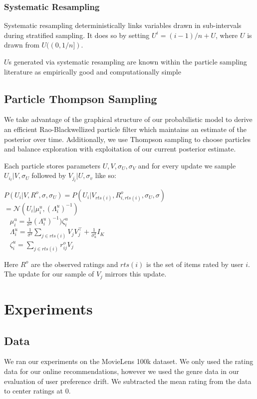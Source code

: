 \documentclass{article}
\begin{document}
\subsubsection{Systematic Resampling}
Systematic resampling deterministically links variables drawn in sub-intervals during stratified sampling. It does so by setting $U^i = (i-1)/n + U$, where $U$ is drawn from $U((0, 1/n])$.

$U$s generated via systematic resampling are known within the particle sampling literature as empirically good and computationally simple \cite{douc2005comparison}

\subsection{Particle Thompson Sampling}
We take advantage of the graphical structure of our probabilistic model to derive an efficient Rao-Blackwellized particle filter which maintains an estimate of the posterior over time. Additionally, we use Thompson sampling to choose particles and balance exploration with exploitation of our current posterior estimate.

Each particle stores parameters $U, V, \sigma_U, \sigma_V$ and for every update we sample $U_{i_t}|V, \sigma_U$
followed by $V_{j_t}|U, \sigma_v$ like so:
\begin{center}
$P(U_i | V, R^o, \sigma, \sigma_U) = P(U_i | V_{rts(i)}, R^o_{i, rts(i)}, \sigma_U, \sigma)$ \\
$= \mathcal{N}(U_i | \mu^u_i, (\Lambda_i^u)^{-1})$ \\
\ \newline
{} $\mu_i^u = \frac{1}{\sigma^2}(\Lambda_i^u)^{-1})\zeta_i^u$ \\
\ \newline
$\Lambda_i^u = \frac{1}{\sigma^2} \sum_{j \in rts(i)} V_j V_j^{\top} + \frac{1}{\sigma_u^2}I_K$ \\
\ \newline
$\zeta_i^u = \sum_{j \in rts(i)} r_{ij}^o V_j$
\end{center}


Here $R^o$ are the observed ratings and $rts(i)$ is the set of items rated by user $i$. The update for our sample of $V_j$ mirrors this update.


\section{Experiments}

\subsection{Data}
We ran our experiments on the MovieLens 100k dataset. We only used the rating data for our
online recommendations, however we used the genre data in our evaluation of user preference
drift. We subtracted the mean rating from the data to center ratings at 0.
\end{document}
